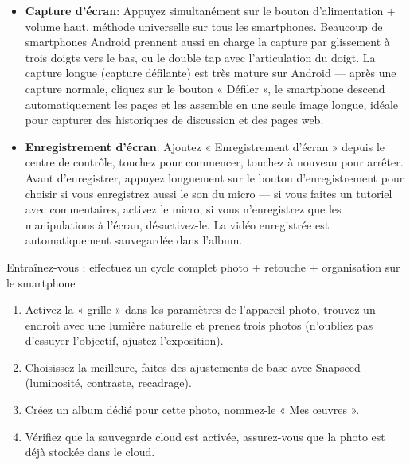 \begin{itemize}
  \item \textbf{Capture d'écran}: Appuyez simultanément sur le bouton d'alimentation + volume haut, méthode universelle sur tous les smartphones. Beaucoup de smartphones Android prennent aussi en charge la capture par glissement à trois doigts vers le bas, ou le double tap avec l'articulation du doigt. La capture longue (capture défilante) est très mature sur Android — après une capture normale, cliquez sur le bouton « Défiler », le smartphone descend automatiquement les pages et les assemble en une seule image longue, idéale pour capturer des historiques de discussion et des pages web.
  \item \textbf{Enregistrement d'écran}: Ajoutez « Enregistrement d'écran » depuis le centre de contrôle, touchez pour commencer, touchez à nouveau pour arrêter. Avant d'enregistrer, appuyez longuement sur le bouton d'enregistrement pour choisir si vous enregistrez aussi le son du micro — si vous faites un tutoriel avec commentaires, activez le micro, si vous n'enregistrez que les manipulations à l'écran, désactivez-le. La vidéo enregistrée est automatiquement sauvegardée dans l'album.
\end{itemize}

\begin{tcbpractice}{Entraînez-vous : effectuez un cycle complet photo + retouche + organisation sur le smartphone}
\begin{enumerate}
  \item Activez la « grille » dans les paramètres de l'appareil photo, trouvez un endroit avec une lumière naturelle et prenez trois photos (n'oubliez pas d'essuyer l'objectif, ajustez l'exposition).
  \item Choisissez la meilleure, faites des ajustements de base avec Snapseed (luminosité, contraste, recadrage).
  \item Créez un album dédié pour cette photo, nommez-le « Mes œuvres ».
  \item Vérifiez que la sauvegarde cloud est activée, assurez-vous que la photo est déjà stockée dans le cloud.
\end{enumerate}

\end{tcbpractice}
